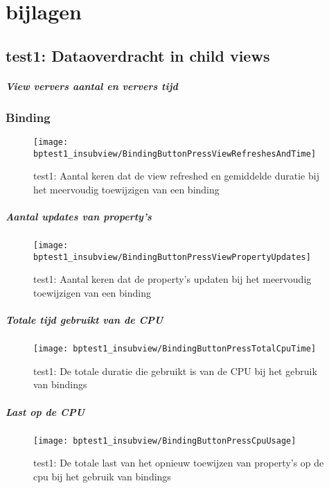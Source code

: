 \chapter{bijlagen}

\section{test1: Dataoverdracht in child views}
\paragraph{View ververs aantal en ververs tijd }
\subsection{Binding}
\begin{figure}[H]
    \centering
    \texttt{[image: bptest1\_insubview/BindingButtonPressViewRefreshesAndTime]} 
    \caption{test1: Aantal keren dat de view refreshed en gemiddelde duratie bij het meervoudig toewijzigen van een binding}
    \label{fig:viewRefreshesBinding1}
\end{figure}
\paragraph{Aantal updates van property's}
\begin{figure}[H]
    \centering
    \texttt{[image: bptest1\_insubview/BindingButtonPressViewPropertyUpdates]} 
    \caption{test1: Aantal keren dat de property's updaten bij het meervoudig toewijzigen van een binding}
    \label{fig:propertyUpdatesBinding1}
\end{figure}
\paragraph{Totale tijd gebruikt van de CPU}
\begin{figure}[H]
    \centering
    \texttt{[image: bptest1\_insubview/BindingButtonPressTotalCpuTime]} 
    \caption{test1: De totale duratie die gebruikt is van de CPU bij het gebruik van bindings}
    \label{fig:cpuUsageTimeBinding1}
\end{figure}
\paragraph{Last op de CPU}
\begin{figure}[H]
    \centering
    \texttt{[image: bptest1\_insubview/BindingButtonPressCpuUsage]} 
    \caption{test1: De totale last van het opnieuw toewijzen van property's op de cpu bij het gebruik van bindings}
    \label{fig:cpuWeightBinding1}
\end{figure}

